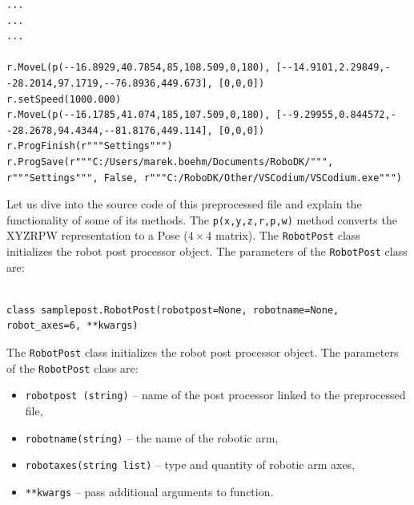 \begin{code}
\begin{verbatim}
...
...
...

r.MoveL(p(--16.8929,40.7854,85,108.509,0,180), [--14.9101,2.29849,--28.2014,97.1719,--76.8936,449.673], [0,0,0])
r.setSpeed(1000.000)
r.MoveL(p(--16.1785,41.074,185,107.509,0,180), [--9.29955,0.844572,--28.2678,94.4344,--81.8176,449.114], [0,0,0])
r.ProgFinish(r"""Settings""")
r.ProgSave(r"""C:/Users/marek.boehm/Documents/RoboDK/""", r"""Settings""", False, r"""C:/RoboDK/Other/VSCodium/VSCodium.exe""")

\end{verbatim}
\label{code:preprocessed_python}
\end{code}



Let us dive into the source code of this preprocessed file and explain the functionality of some of its methods. The \texttt{p(x,y,z,r,p,w)} method converts the XYZRPW representation to a Pose ($ 4 \times 4 $ matrix). The \texttt{RobotPost} class initializes the robot post processor object. The parameters of the \texttt{RobotPost} class are:


\begin{verbatim}

class samplepost.RobotPost(robotpost=None, robotname=None, robot_axes=6, **kwargs)

\end{verbatim}

The \texttt{RobotPost} class initializes the robot post processor object. 
The parameters of the \texttt{RobotPost} class are:

\begin{itemize}

\item \texttt{robotpost (string)} -- name of the post processor linked to the preprocessed file,

\item \texttt{robotname(string)} -- the name of the robotic arm,

\item \texttt{robotaxes(string list)} -- type and quantity of robotic arm axes,

\item \texttt{**kwargs} -- pass additional arguments to function.

\end{itemize}




